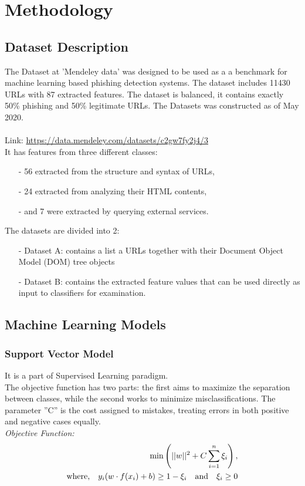 \section{Methodology}
\subsection{Dataset Description}
The Dataset at ’Mendeley data’ was designed to be used as a a benchmark for machine learning based phishing detection systems. The dataset includes 11430 URLs with 87 extracted features. The dataset is balanced, it contains exactly 50\% phishing and 50\% legitimate URLs. The Datasets was constructed as of May 2020.\\\\
Link: {\small \url{https://data.mendeley.com/datasets/c2gw7fy2j4/3}}\\
It has features from three different classes:
\begin{itemize}
    \item[-] 56 extracted from the structure and syntax of URLs,
    \item[-] 24 extracted from analyzing their HTML contents,
    \item[-] and 7 were extracted by querying external services.
\end{itemize}
The datasets are divided into 2:
\begin{itemize}
    \item[-] Dataset A: contains a list a URLs together with their
            Document Object Model (DOM) tree objects
    \item[-] Dataset B: contains the extracted feature values that can
            be used directly as input to classifiers for examination.
\end{itemize}
\subsection{Machine Learning Models}
\subsubsection{Support Vector Model}
It is a part of Supervised Learning paradigm.\\
The objective function has two parts: the first aims to maximize the separation between classes, while the second works to minimize misclassifications. The parameter ”C” is the cost assigned to mistakes, treating errors in both positive and negative cases equally.\\
\textit{Objective Function:}
\begin{align}
    \min_{} \left( ||w||^2 + C \sum_{i=1}^n \xi_i \right),\\ 
    \text{where,\quad} y_i (w \cdot f(x_i) + b) \geq 1 - \xi_i \quad 
    \text{and} \quad \xi_i \geq 0
\end{align}

